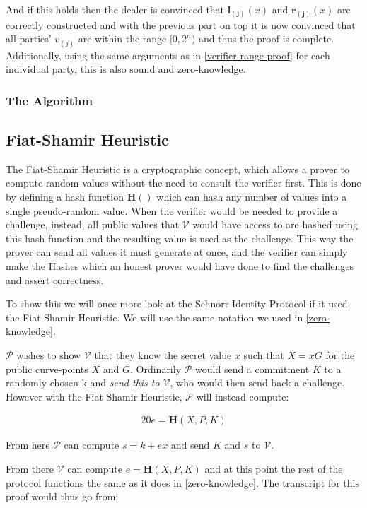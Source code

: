 \documentclass{article}
\newcommand{\eq}[1]{\begin{alignat*}{20}#1\end{alignat*}}
\renewcommand{\vec}[1]{\boldsymbol{#1}}
\newcommand{\V}{\mathcal{V}}
\renewcommand{\P}{\mathcal{P}}
\begin{document}
And if this holds then the dealer is convinced that $\vec{l_{(j)}}(x)$ and $\vec{r_{(j)}}(x)$ are correctly constructed and with the previous part on top it is now convinced that all parties' $v_{(j)}$ are within the range $[0,2^n)$ and thus the proof is complete. Additionally, using the same arguments as in \ref{verifier-range-proof} for each individual party, this is also sound and zero-knowledge.

\subsubsection{The Algorithm}

\subsection{Fiat-Shamir Heuristic}\label{fiat-shamir-heuristic}

The Fiat-Shamir Heuristic is a cryptographic concept, which allows a prover to compute random values without the need to consult the verifier first. This is done by defining a hash function $\textbf{H}()$ which can hash any number of values into a single pseudo-random value. When the verifier would be needed to provide a challenge, instead, all public values that $\V$ would have access to are hashed using this hash function and the resulting value is used as the challenge. This way the prover can send all values it must generate at once, and the verifier can simply make the Hashes which an honest prover would have done to find the challenges and assert correctness. 

To show this we will once more look at the Schnorr Identity Protocol if it used the Fiat Shamir Heuristic. We will use the same notation we used in \ref{zero-knowledge}. 

$\P$ wishes to show $\V$ that they know the secret value $x$ such that $X = xG$ for the public curve-points $X$ and $G$. Ordinarily $\P$ would send a commitment $K$ to a randomly chosen k and \textit{send this to $\V$}, who would then send back a challenge. However with the Fiat-Shamir Heuristic, $\P$ will instead compute:

\eq{
	e = \textbf{H}(X,P,K)
}

From here $\P$ can compute $s = k + ex$ and send $K$ and $s$ to $\V$. 

From there $\V$ can compute $e = \textbf{H}(X,P,K)$ and at this point the rest of the protocol functions the same as it does in \ref{zero-knowledge}. The transcript for this proof would thus go from:
\end{document}
